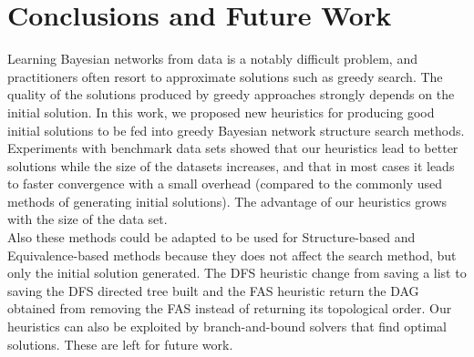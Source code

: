 \section{Conclusions and Future Work}
\label{sec:conclusions}

Learning Bayesian networks from data is a notably difficult problem, and practitioners often resort to approximate solutions such as greedy search. The quality of the solutions produced by greedy approaches strongly depends on the initial solution. In this work, we proposed new heuristics for producing good initial solutions to be fed into greedy Bayesian network structure search methods.\\
Experiments with benchmark data sets showed that our heuristics lead to better solutions while the size of the datasets increases, and that in most cases it leads to faster convergence with a small overhead (compared to the commonly used methods of generating initial solutions). The advantage of our heuristics grows with the size of the data set.\\
Also these methods could be adapted to be used for Structure-based and Equivalence-based methods because they does not affect the search method, but only the initial solution generated. The DFS heuristic change from saving a list to saving the DFS directed tree built and the FAS heuristic return the DAG obtained from removing the FAS instead of returning its topological order. Our heuristics can also be exploited by branch-and-bound solvers that find optimal solutions. These are left for future work.
\vspace{-4mm}